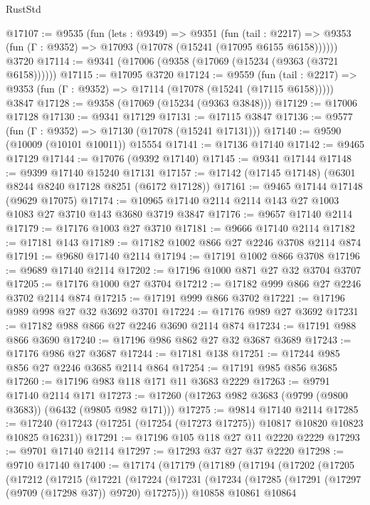 \begin{lexlean}{RustStd}
\begin{coremodule}
@17107 := @9535
    (fun (lets : @9349) =>
    @9351
      (fun (tail : @2217) =>
      @9353 (fun (Γ : @9352) => @17093 (@17078 (@15241 (@17095 @6155 @6158))))))
    @3720
@17114 := @9341 (@17006 (@9358 (@17069 (@15234 (@9363 (@3721 @6158))))))
@17115 := @17095 @3720
@17124 := @9559
    (fun (tail : @2217) => @9353 (fun (Γ : @9352) => @17114 (@17078 (@15241 (@17115 @6158)))))
    @3847
@17128 := @9358 (@17069 (@15234 (@9363 @3848)))
@17129 := @17006 @17128
@17130 := @9341 @17129
@17131 := @17115 @3847
@17136 := @9577 (fun (Γ : @9352) => @17130 (@17078 (@15241 @17131)))
@17140 := @9590 (@10009 (@10101 @10011)) @15554
@17141 := @17136 @17140
@17142 := @9465 @17129
@17144 := @17076 (@9392 @17140)
@17145 := @9341 @17144
@17148 := @9399 @17140 @15240 @17131
@17157 := @17142 (@17145 @17148) (@6301 @8244 @8240 @17128 @8251 (@6172 @17128))
@17161 := @9465 @17144 @17148 (@9629 @17075)
@17174 := @10965 @17140 @2114 @2114 @143 @27 @1003 @1083 @27 @3710 @143 @3680 @3719 @3847
@17176 := @9657 @17140 @2114
@17179 := @17176 @1003 @27 @3710
@17181 := @9666 @17140 @2114
@17182 := @17181 @143
@17189 := @17182 @1002 @866 @27 @2246 @3708 @2114 @874
@17191 := @9680 @17140 @2114
@17194 := @17191 @1002 @866 @3708
@17196 := @9689 @17140 @2114
@17202 := @17196 @1000 @871 @27 @32 @3704 @3707
@17205 := @17176 @1000 @27 @3704
@17212 := @17182 @999 @866 @27 @2246 @3702 @2114 @874
@17215 := @17191 @999 @866 @3702
@17221 := @17196 @989 @998 @27 @32 @3692 @3701
@17224 := @17176 @989 @27 @3692
@17231 := @17182 @988 @866 @27 @2246 @3690 @2114 @874
@17234 := @17191 @988 @866 @3690
@17240 := @17196 @986 @862 @27 @32 @3687 @3689
@17243 := @17176 @986 @27 @3687
@17244 := @17181 @138
@17251 := @17244 @985 @856 @27 @2246 @3685 @2114 @864
@17254 := @17191 @985 @856 @3685
@17260 := @17196 @983 @118 @171 @11 @3683 @2229
@17263 := @9791 @17140 @2114 @171
@17273 := @17260 (@17263 @982 @3683 (@9799 (@9800 @3683)) (@6432 (@9805 @982 @171)))
@17275 := @9814 @17140 @2114
@17285 := @17240 (@17243 (@17251 (@17254 (@17273 @17275)) @10817 @10820 @10823 @10825 @16231))
@17291 := @17196 @105 @118 @27 @11 @2220 @2229
@17293 := @9701 @17140 @2114
@17297 := @17293 @37 @27 @37 @2220
@17298 := @9710 @17140
@17400 := @17174
    (@17179
      (@17189
        (@17194
          (@17202
            (@17205
              (@17212
                (@17215
                  (@17221
                    (@17224
                      (@17231
                        (@17234 (@17285 (@17291 (@17297 (@9709 (@17298 @37)) @9720) @17275)))
                        @10858
                        @10861
                        @10864

\end{coremodule}
\end{lexlean}

